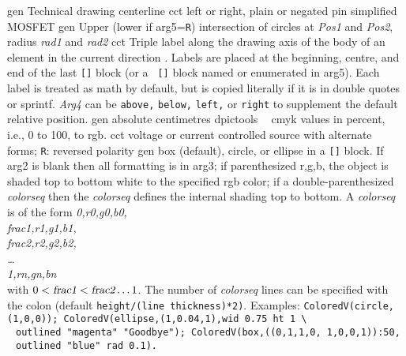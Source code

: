   {gen}%
  {Technical drawing centerline}%
%
  {cct}%
  {left or right, plain or negated pin simplified MOSFET}%
%
  {gen}%
  {Upper (lower if arg5={\tt R}) intersection of circles at
    {\sl Pos1} and {\sl Pos2}, radius {\sl rad1} and {\sl rad2}}
%
  {cct}%
  {Triple label along the drawing axis of the body of an element in the
    current direction .  Labels are placed at the
    beginning, centre, and end of the last {\tt []} block (or a {\tt
    []} block named or enumerated in arg5). Each label is treated as
    math by default, but is copied literally if it is in double quotes
    or sprintf.  {\sl Arg4} can be {\tt above,} {\tt below,} {\tt left,}
    or {\tt right} to supplement the default relative position.}%
%
  {gen}%
  {absolute centimetres}%
%
  {dpictools}%
  {$\;\;$ cmyk values in percent, i.e., 0 to 100, to rgb.}%
%
  {cct}%
  {voltage or current controlled source with alternate forms;
   {\tt R}: reversed polarity}%
%
  {gen}%
  {box (default), circle, or ellipse in a {\tt []} block.
   If arg2 is blank
   then all formatting is in arg3; if parenthesized r,g,b, the object
   is shaded top to bottom white to the specified rgb color; if a
   double-parenthesized {\sl colorseq} then the {\sl colorseq}
   defines the internal
   shading top to bottom.  A {\sl colorseq} is of the form
   {\sl 0,r0,g0,b0,\\
    frac1,r1,g1,b1,\\
    frac2,r2,g2,b2,\\
   \ldots\\
    1,rn,gn,bn}\\
   with $0 < \hbox{\sl frac1} < \hbox{\sl frac2} \ldots 1$.
   The number of {\sl colorseq} lines can be specified with the colon
   (default {\tt height/(line thickness)*2)}.
   Examples: {\tt ColoredV(circle,(1,0,0));
   ColoredV(ellipse,(1,0.04,1),wid 0.75 ht 1 \textbackslash\\
    $\;$ outlined "magenta" "Goodbye");
   ColoredV(box,((0,1,1,0, 1,0,0,1)):50, \\
    $\;$ outlined "blue" rad 0.1).} }%
